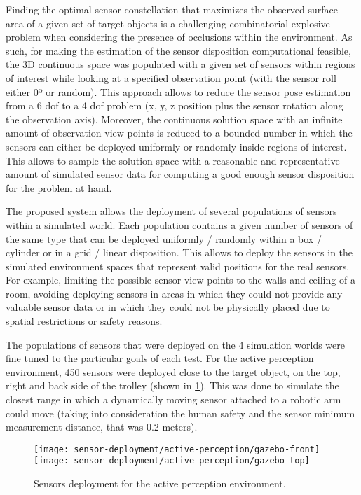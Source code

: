 Finding the optimal sensor constellation that maximizes the observed surface area of a given set of target objects is a challenging combinatorial explosive problem when considering the presence of occlusions within the environment. As such, for making the estimation of the sensor disposition computational feasible, the 3D continuous space was populated with a given set of sensors within regions of interest while looking at a specified observation point (with the sensor roll either 0º or random). This approach allows to reduce the sensor pose estimation from a 6 \gls{dof} to a 4 \gls{dof} problem (x, y, z position plus the sensor rotation along the observation axis). Moreover, the continuous solution space with an infinite amount of observation view points is reduced to a bounded number in which the sensors can either be deployed uniformly or randomly inside regions of interest. This allows to sample the solution space with a reasonable and representative amount of simulated sensor data for computing a good enough sensor disposition for the problem at hand.

The proposed system allows the deployment of several populations of sensors within a simulated world. Each population contains a given number of sensors of the same type that can be deployed uniformly / randomly within a box / cylinder or in a grid / linear disposition. This allows to deploy the sensors in the simulated environment spaces that represent valid positions for the real sensors. For example, limiting the possible sensor view points to the walls and ceiling of a room, avoiding deploying sensors in areas in which they could not provide any valuable sensor data or in which they could not be physically placed due to spatial restrictions or safety reasons.

The populations of sensors that were deployed on the 4 simulation worlds were fine tuned to the particular goals of each test. For the active perception environment, 450 sensors were deployed close to the target object, on the top, right and back side of the trolley (shown in \cref{fig:sensors-deployment-active-perception-environment}). This was done to simulate the closest range in which a dynamically moving sensor attached to a robotic arm could move (taking into consideration the human safety and the sensor minimum measurement distance, that was 0.2 meters).

\begin{figure}[H]
	\centering
	\texttt{[image: sensor-deployment/active-perception/gazebo-front]}\hspace{1em}
	\texttt{[image: sensor-deployment/active-perception/gazebo-top]}
	\caption{Sensors deployment for the active perception environment.}
	\label{fig:sensors-deployment-active-perception-environment}
\end{figure}

